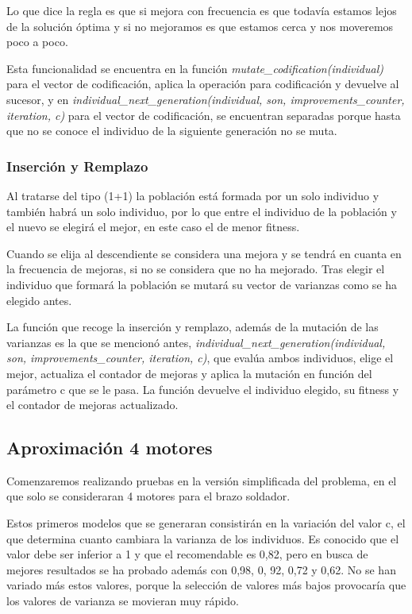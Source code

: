 \documentclass[12pt, spanish, pdftex]{UC3M_document}
\begin{document}
Lo que dice la regla es que si mejora con frecuencia es que todavía estamos lejos de la solución óptima y si no mejoramos es que estamos cerca y nos moveremos poco a poco.

Esta funcionalidad se encuentra en la función \textit{mutate\_codification(individual)} para el vector de codificación, aplica la operación para codificación y devuelve al sucesor, y en \textit{individual\_next\_generation(individual, son, improvements\_counter, iteration, c)} para el vector de codificación, se encuentran separadas porque hasta que no se conoce el individuo de la siguiente generación no se muta.

\subsubsection{Inserción y Remplazo}
Al tratarse del tipo (1+1) la población está formada por un solo individuo y también habrá un solo individuo, por lo que entre el individuo de la población y el nuevo se elegirá el mejor, en este caso el de menor fitness.

Cuando se elija al descendiente se considera una mejora y se tendrá en cuanta en la frecuencia de mejoras, si no se considera que no ha mejorado. Tras elegir el individuo que formará la población se mutará su vector de varianzas como se ha elegido antes.

La función que recoge la inserción y remplazo, además de la mutación de las varianzas es la que se mencionó antes, \textit{individual\_next\_generation(individual, son, improvements\_counter, iteration, c)}, que evalúa ambos individuos, elige el mejor, actualiza el contador de mejoras y aplica la mutación en función del parámetro c que se le pasa. La función devuelve el individuo elegido, su fitness y el contador de mejoras actualizado. 

\subsection{Aproximación 4 motores}
Comenzaremos realizando pruebas en la versión simplificada del problema, en el que solo se consideraran 4 motores para el brazo soldador. 

Estos primeros modelos que se generaran consistirán en la variación del valor c, el que determina cuanto cambiara la varianza de los individuos. Es conocido que el valor debe ser inferior a 1 y que el recomendable es 0,82, pero en busca de mejores resultados se ha probado además con 0,98, 0, 92, 0,72 y 0,62. No se han variado más estos valores, porque la selección de valores más bajos provocaría que los valores de varianza se movieran muy rápido.
\end{document}
